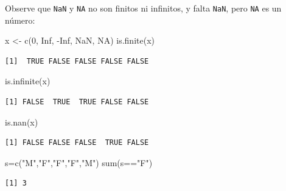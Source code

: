 \documentclass[
  ignorenonframetext,
  aspectratio=169,
  spanish,
]{beamer}
\newenvironment{Shaded}{\begin{snugshade}}{\end{snugshade}}
\newcommand{\ConstantTok}[1]{\textcolor[rgb]{0.56,0.35,0.01}{#1}}
\newcommand{\DecValTok}[1]{\textcolor[rgb]{0.68,0.00,0.00}{#1}}
\newcommand{\FunctionTok}[1]{\textcolor[rgb]{0.28,0.35,0.67}{#1}}
\newcommand{\NormalTok}[1]{\textcolor[rgb]{0.00,0.23,0.31}{#1}}
\newcommand{\OtherTok}[1]{\textcolor[rgb]{0.00,0.23,0.31}{#1}}
\newcommand{\SpecialCharTok}[1]{\textcolor[rgb]{0.37,0.37,0.37}{#1}}
\newcommand{\StringTok}[1]{\textcolor[rgb]{0.13,0.47,0.30}{#1}}
\begin{document}
\begin{frame}[fragile]{}
\label{section-5}
Observe que \texttt{NaN} y \texttt{NA} no son finitos ni infinitos, y
falta \texttt{NaN}, pero \texttt{NA} es un número:

\begin{Shaded}
\begin{Highlighting}[]
\NormalTok{x }\OtherTok{\textless{}{-}} \FunctionTok{c}\NormalTok{(}\DecValTok{0}\NormalTok{, }\ConstantTok{Inf}\NormalTok{, }\SpecialCharTok{{-}}\ConstantTok{Inf}\NormalTok{, }\ConstantTok{NaN}\NormalTok{, }\ConstantTok{NA}\NormalTok{) }
\FunctionTok{is.finite}\NormalTok{(x)}
\end{Highlighting}
\end{Shaded}

\begin{verbatim}
[1]  TRUE FALSE FALSE FALSE FALSE
\end{verbatim}
\end{frame}

\begin{frame}[fragile]{}
\label{section-6}
\begin{Shaded}
\begin{Highlighting}[]
\FunctionTok{is.infinite}\NormalTok{(x)}
\end{Highlighting}
\end{Shaded}

\begin{verbatim}
[1] FALSE  TRUE  TRUE FALSE FALSE
\end{verbatim}

\begin{Shaded}
\begin{Highlighting}[]
\FunctionTok{is.nan}\NormalTok{(x)}
\end{Highlighting}
\end{Shaded}

\begin{verbatim}
[1] FALSE FALSE FALSE  TRUE FALSE
\end{verbatim}

\begin{Shaded}
\begin{Highlighting}[]
\NormalTok{s}\OtherTok{=}\FunctionTok{c}\NormalTok{(}\StringTok{"M"}\NormalTok{,}\StringTok{"F"}\NormalTok{,}\StringTok{"F"}\NormalTok{,}\StringTok{"F"}\NormalTok{,}\StringTok{"M"}\NormalTok{) }
\FunctionTok{sum}\NormalTok{(s}\SpecialCharTok{==}\StringTok{"F"}\NormalTok{)  }
\end{Highlighting}
\end{Shaded}

\begin{verbatim}
[1] 3
\end{verbatim}
\end{frame}
\end{document}
